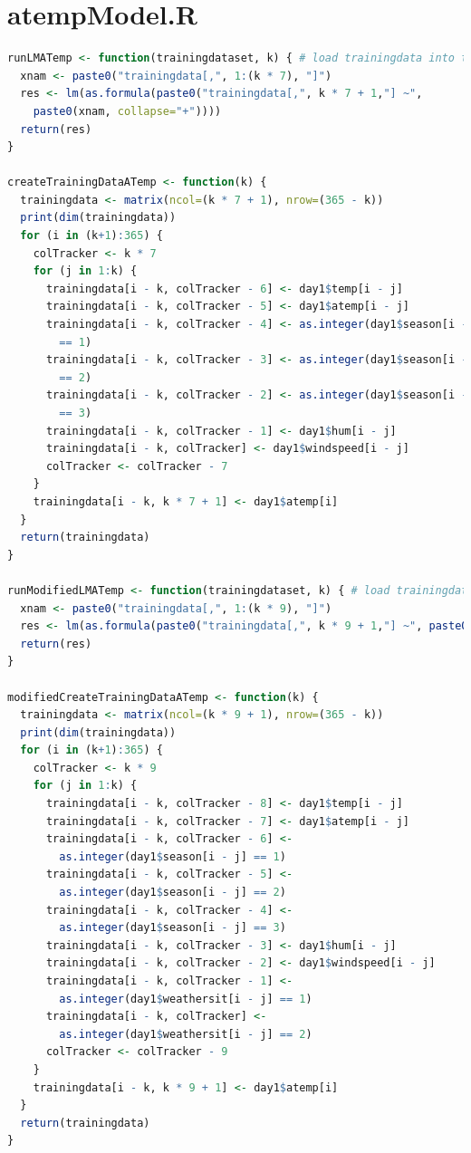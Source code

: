 \documentclass[12pt]{article}
\begin{document}
\section{atempModel.R} 
\begin{lstlisting}[language=R]
runLMATemp <- function(trainingdataset, k) { # load trainingdata into trainingdata var
  xnam <- paste0("trainingdata[,", 1:(k * 7), "]")
  res <- lm(as.formula(paste0("trainingdata[,", k * 7 + 1,"] ~", 	
  	paste0(xnam, collapse="+"))))
  return(res)
}

createTrainingDataATemp <- function(k) {
  trainingdata <- matrix(ncol=(k * 7 + 1), nrow=(365 - k))
  print(dim(trainingdata))
  for (i in (k+1):365) {
    colTracker <- k * 7
    for (j in 1:k) {
      trainingdata[i - k, colTracker - 6] <- day1$temp[i - j]
      trainingdata[i - k, colTracker - 5] <- day1$atemp[i - j]
      trainingdata[i - k, colTracker - 4] <- as.integer(day1$season[i - j] 
      	== 1)
      trainingdata[i - k, colTracker - 3] <- as.integer(day1$season[i - j] 
      	== 2)
      trainingdata[i - k, colTracker - 2] <- as.integer(day1$season[i - j] 
      	== 3)
      trainingdata[i - k, colTracker - 1] <- day1$hum[i - j]
      trainingdata[i - k, colTracker] <- day1$windspeed[i - j]
      colTracker <- colTracker - 7
    }
    trainingdata[i - k, k * 7 + 1] <- day1$atemp[i]
  }
  return(trainingdata)
}

runModifiedLMATemp <- function(trainingdataset, k) { # load trainingdata into trainingdata var first
  xnam <- paste0("trainingdata[,", 1:(k * 9), "]")
  res <- lm(as.formula(paste0("trainingdata[,", k * 9 + 1,"] ~", paste0(xnam, collapse="+"))))
  return(res)
}

modifiedCreateTrainingDataATemp <- function(k) {
  trainingdata <- matrix(ncol=(k * 9 + 1), nrow=(365 - k))
  print(dim(trainingdata))
  for (i in (k+1):365) {
    colTracker <- k * 9
    for (j in 1:k) {
      trainingdata[i - k, colTracker - 8] <- day1$temp[i - j]
      trainingdata[i - k, colTracker - 7] <- day1$atemp[i - j]
      trainingdata[i - k, colTracker - 6] <- 
      	as.integer(day1$season[i - j] == 1)
      trainingdata[i - k, colTracker - 5] <- 
      	as.integer(day1$season[i - j] == 2)
      trainingdata[i - k, colTracker - 4] <- 
      	as.integer(day1$season[i - j] == 3)
      trainingdata[i - k, colTracker - 3] <- day1$hum[i - j]
      trainingdata[i - k, colTracker - 2] <- day1$windspeed[i - j]
      trainingdata[i - k, colTracker - 1] <- 
      	as.integer(day1$weathersit[i - j] == 1)
      trainingdata[i - k, colTracker] <- 
      	as.integer(day1$weathersit[i - j] == 2)
      colTracker <- colTracker - 9
    }
    trainingdata[i - k, k * 9 + 1] <- day1$atemp[i]
  }
  return(trainingdata)
}


\end{lstlisting}
\end{document}
